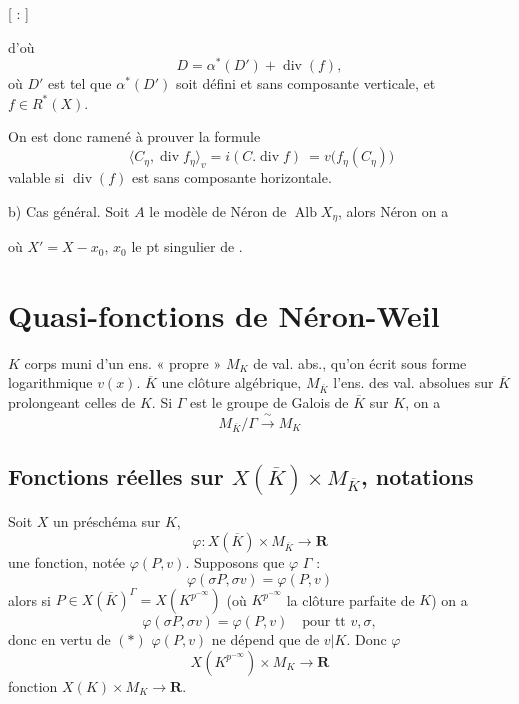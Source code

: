 \documentclass[11pt,a4paper]{article}
\begin{document}
[ \ill{} : \ill{}]

d'où
\[
  D = \alpha^*(D') + \operatorname{div}(f) ,
\]
où $D'$ est tel que $\alpha^*(D')$ soit défini et sans composante
verticale, et $f \in R^*(X)$. 

On est donc ramené à prouver la formule
\[
  \boxed{\ \langle C_\eta, \operatorname{div} f_\eta \rangle_v
  = i(C.\operatorname{div} f)\ }
  = v\bigl(f_\eta(C_\eta)\bigr)
\]
valable si $\operatorname{div}(f)$ est sans composante horizontale.

b) Cas général. Soit $A$ le modèle de Néron de $\operatorname{Alb} X_\eta$,
alors  Néron on a


où  $X' = X - x_0$,  $x_0$ le pt
singulier de .

\section{Quasi-fonctions de Néron-Weil}

$K$ corps muni d'un ens. « propre » $M_K$ de val. abs., qu'on écrit sous
forme logarithmique $v(x)$. $\overline{K}$ une clôture algébrique,
$M_{\overline{K}}$ l'ens. des val. absolues sur $\overline{K}$ prolongeant
celles de $K$. Si $\Gamma$ est le groupe de Galois de $\overline{K}$ sur $K$,
on a
\[
  M_{\overline{K}} / \Gamma \xrightarrow{\ \sim\ } M_K
\]

\subsection{Fonctions réelles sur $X(\overline{K}) \times M_{\overline{K}}$, notations}

Soit $X$ un préschéma sur $K$, \struck{\ill{}}
\[
  \varphi : X(\overline{K}) \times M_{\overline{K}} \to \mathbf{R}
\]
une fonction, notée $\varphi(P, v)$. Supposons que $\varphi$
 $\Gamma$ :
\[
  \varphi(\sigma P, \sigma v) = \varphi(P, v)
\]
alors  si \struck{\ill{}}
$P \in X(\overline{K})^{\Gamma} = X(K^{p^{-\infty}})$ (où $K^{p^{-\infty}}$
la clôture parfaite de $K$) \struck{\ill{}} on a
\[
  \varphi(\sigma P, \sigma v) = \varphi(P, v) \quad \text{pour tt } v, \sigma ,
\]
donc en vertu de $(*)$ $\varphi(P, v)$ ne dépend que de $v|K$. Donc $\varphi$
\[
  X(K^{p^{-\infty}}) \times M_K \to \mathbf{R}
\]
\ill{} fonction $X(K) \times M_K \to \mathbf{R}$.
\end{document}

